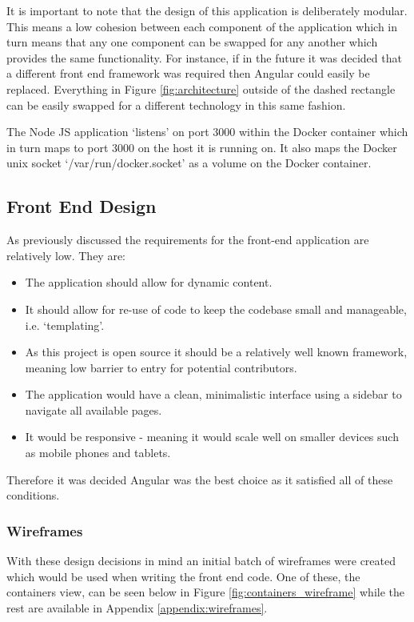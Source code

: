 It is important to note that the design of this application is deliberately modular. This means a low cohesion between each component of the application which in turn means that any one component can be swapped for any another which provides the same functionality. For instance, if in the future it was decided that a different front end framework was required then Angular could easily be replaced. Everything in Figure \ref{fig:architecture} outside of the dashed rectangle can be easily swapped for a different technology in this same fashion.

The Node JS application `listens' on port 3000 within the \gls{Docker container} which in turn maps to port 3000 on the host it is running on. It also maps the Docker unix socket `/var/run/docker.socket' as a volume on the Docker container.  

\subsection{Front End Design}
As previously discussed the requirements for the front-end application are relatively low. They are:

\begin{itemize}
	\item The application should allow for dynamic content.
	\item It should allow for re-use of code to keep the codebase small and manageable, i.e. `templating'.
	\item As this project is open source it should be a relatively well known framework, meaning low barrier to entry for potential contributors.
	\item The application would have a clean, minimalistic interface using a sidebar to navigate all available pages. 
	\item It would be responsive - meaning it would scale well on smaller devices such as mobile phones and tablets.
\end{itemize}

Therefore it was decided Angular was the best choice as it satisfied all of these conditions.

\subsubsection{Wireframes}
With these design decisions in mind an initial batch of wireframes were created which would be used when writing the front end code. One of these, the containers view, can be seen below in Figure \ref{fig:containers_wireframe} while the rest are available in Appendix \ref{appendix:wireframes}.

